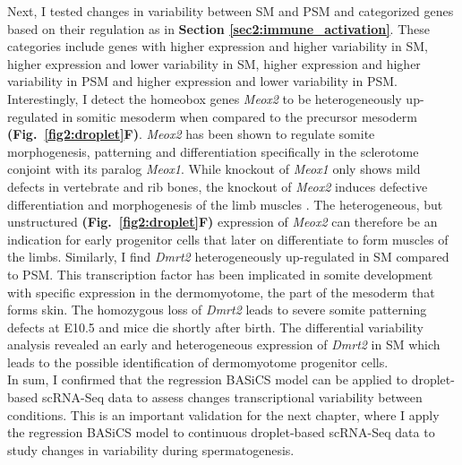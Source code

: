 Next, I tested changes in variability between SM and PSM and categorized genes based on their regulation as in \textbf{Section \ref{sec2:immune_activation}}. These categories include genes with higher expression and higher variability in SM, higher expression and lower variability in SM, higher expression and higher variability in PSM and higher expression and lower variability in PSM. Interestingly, I detect the homeobox genes \textit{Meox2} to be heterogeneously up-regulated in somitic mesoderm when compared to the precursor mesoderm \textbf{(Fig.~\ref{fig2:droplet}F)}. \textit{Meox2} has been shown to regulate somite morphogenesis, patterning and differentiation specifically in the sclerotome conjoint with its paralog \textit{Meox1}. While knockout of \textit{Meox1} only shows mild defects in vertebrate and rib bones, the knockout of \textit{Meox2} induces defective differentiation and morphogenesis of the limb muscles \cite{Mankoo2003}. The heterogeneous, but unstructured \textbf{(Fig.~\ref{fig2:droplet}F)} expression of \textit{Meox2} can therefore be an indication for early progenitor cells that later on differentiate to form  muscles of the limbs. Similarly, I find \textit{Dmrt2} heterogeneously up-regulated in SM compared to PSM. This transcription factor has been implicated in somite development with specific expression in the dermomyotome, the part of the mesoderm that forms skin. The homozygous loss of \textit{Dmrt2} leads to severe somite patterning defects at E10.5 and mice die shortly after birth\citep{Seo2006}. The differential variability analysis revealed an early and heterogeneous expression of \textit{Dmrt2} in SM which leads to the possible identification of dermomyotome progenitor cells.\\

In sum, I confirmed that the regression BASiCS model can be applied to droplet-based scRNA-Seq data to assess changes transcriptional variability between conditions. This is an important validation for the next chapter, where I apply the regression BASiCS model to continuous droplet-based scRNA-Seq data to study changes in variability during spermatogenesis. 

